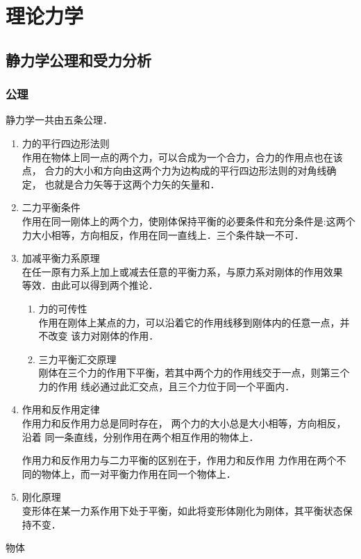 

\part{理论力学}

\chapter{静力学公理和受力分析}

\section{公理}
静力学一共由五条公理．
\begin{enumerate}
\item 力的平行四边形法则 \\
作用在物体上同一点的两个力，可以合成为一个合力，合力的作用点也在该点，
合力的大小和方向由这两个力为边构成的平行四边形法则的对角线确定，
也就是合力矢等于这两个力矢的矢量和．
\item 二力平衡条件 \\
作用在同一刚体上的两个力，使刚体保持平衡的必要条件和充分条件是:这两个
力大小相等，方向相反，作用在同一直线上．三个条件缺一不可．
\item 加减平衡力系原理 \\
在任一原有力系上加上或减去任意的平衡力系，与原力系对刚体的作用效果
等效．由此可以得到两个推论．
\begin{enumerate}
\item 力的可传性 \\
作用在刚体上某点的力，可以沿着它的作用线移到刚体内的任意一点，并不改变
该力对刚体的作用．
\item 三力平衡汇交原理 \\
刚体在三个力的作用下平衡，若其中两个力的作用线交于一点，则第三个力的作用
线必通过此汇交点，且三个力位于同一个平面内．
\end{enumerate}
\item 作用和反作用定律 \\
作用力和反作用力总是同时存在， 两个力的大小总是大小相等，方向相反，沿着
同一条直线，分别作用在两个相互作用的物体上．
\begin{notice}
作用力和反作用力与二力平衡的区别在于，作用力和反作用
力作用在两个不同的物体上，而一对平衡力作用在同一个物体上．
\end{notice}
\item 刚化原理 \\
变形体在某一力系作用下处于平衡，如此将变形体刚化为刚体，其平衡状态保持不变．
\end{enumerate}

物体
